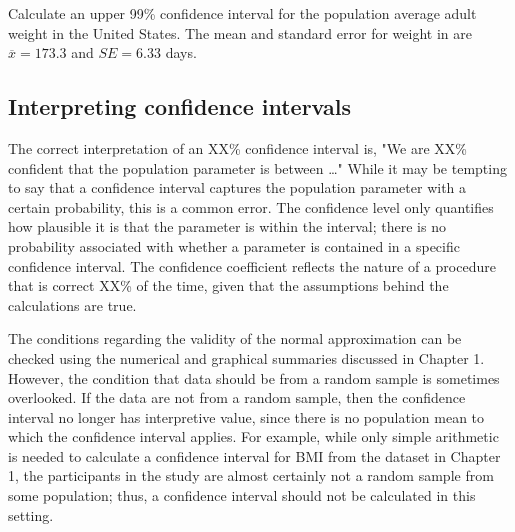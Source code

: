 \begin{exercisewrap}
\begin{nexercise}
Calculate an upper 99\% confidence interval for the population average adult weight in the United States. The mean and standard error for weight in  are $\overline{x} = 173.3$ and $SE = 6.33$ days.\footnotemark{}
\end{nexercise}
\end{exercisewrap}



\subsection{Interpreting confidence intervals}
\label{interpretingCIs}


The correct interpretation of an XX\% confidence interval is, "We are XX\% confident that the population parameter is between \dots" While it may be tempting to say that a confidence interval captures the population parameter with a certain probability, this is a common error. The confidence level only quantifies how plausible it is that the parameter is within the interval; there is no probability associated with whether a parameter is contained in a specific confidence interval. The confidence coefficient reflects the nature of a procedure that is correct XX\% of the time, given that the assumptions behind the calculations are true.

\textD{\newpage}

The conditions regarding the validity of the normal approximation can be checked using the numerical and graphical summaries discussed in Chapter 1. However, the condition that data should be from a random sample is sometimes overlooked. If the data are not from a random sample, then the confidence interval no longer has interpretive value, since there is no population mean to which the confidence interval applies. For example, while only simple arithmetic is needed to calculate a confidence interval for BMI from the  dataset in Chapter 1, the participants in the study are almost certainly not a random sample from some population; thus, a confidence interval should not be calculated in this setting.

